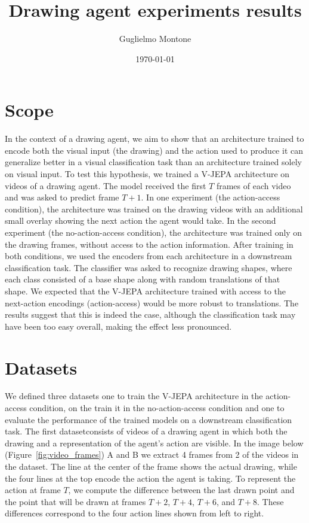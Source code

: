 \documentclass[11pt,a4paper]{article}
\title{Drawing agent experiments results}
\author{Guglielmo Montone}
\date{\today}
\begin{document}
\maketitle

\section{Scope}
In the context of a drawing agent, we aim to show that an architecture trained to encode both the visual input (the drawing) and the action used to produce it can generalize better in a visual classification task than an architecture trained solely on visual input.
To test this hypothesis, we trained a V-JEPA architecture on videos of a drawing agent. The model received the first $T$ frames of each video and was asked to predict frame $T+1$. In one experiment (the action-access condition), the architecture was trained on the drawing videos with an additional small overlay showing the next action the agent would take. In the second experiment (the no-action-access condition), the architecture was trained only on the drawing frames, without access to the action information.
After training in both conditions, we used the encoders from each architecture in a downstream classification task. The classifier was asked to recognize drawing shapes, where each class consisted of a base shape along with random translations of that shape.
We expected that the V-JEPA architecture trained with access to the next-action encodings (action-access) would be more robust to translations. The results suggest that this is indeed the case, although the classification task may have been too easy overall, making the effect less pronounced.

\section{Datasets}
We defined three datasets one to train the V-JEPA architecture in the action-access condition, on the train it in the no-action-access condition and 
one to evaluate the performance of the trained models on a downstream classification task.
The first datasetconsists of videos of a drawing agent in which both the drawing and a representation of the agent’s action are visible. 
In the image below (Figure~\ref{fig:video_frames}) A and B we extract 4 frames from 2 of the videos in the dataset. 
The line at the center of the frame shows the actual drawing, while the four lines at the top encode the action the agent is taking.
To represent the action at frame $T$, we compute the difference between the last drawn point and the point that will be drawn at frames $T+2$, $T+4$, $T+6$, and $T+8$. These differences correspond to the four action lines shown from left to right.
\end{document}

